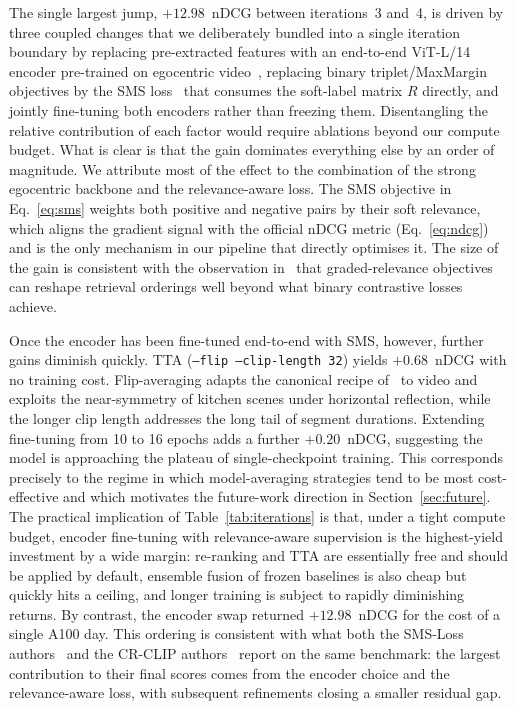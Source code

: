 The single largest jump, $+12.98$~nDCG between iterations~3 and~4, is driven by three coupled changes that we deliberately bundled into a single iteration boundary by replacing pre-extracted features with an end-to-end ViT-L/14 encoder pre-trained on egocentric video~\cite{zhao2023avion,zhao2023lavila}, replacing binary triplet/MaxMargin objectives by the SMS loss~\cite{wang2024symmetricmultisimilaritylossepickitchens100} that consumes the soft-label matrix $R$ directly, and jointly fine-tuning both encoders rather than freezing them. Disentangling the relative contribution of each factor would require ablations beyond our compute budget. What is clear is that the gain dominates everything else by an order of magnitude. We attribute most of the effect to the combination of the strong egocentric backbone and the relevance-aware loss. The SMS objective in Eq.~\eqref{eq:sms} weights both positive and negative pairs by their soft relevance, which aligns the gradient signal with the official nDCG metric (Eq.~\eqref{eq:ndcg}) and is the only mechanism in our pipeline that directly optimises it. The size of the gain is consistent with the observation in~\cite{wray2021semantic} that graded-relevance objectives can reshape retrieval orderings well beyond what binary contrastive losses achieve.

Once the encoder has been fine-tuned end-to-end with SMS, however, further gains diminish quickly. TTA (\texttt{--flip --clip-length 32}) yields $+0.68$~nDCG with no training cost. Flip-averaging adapts the canonical recipe of~\cite{krizhevsky2012alexnet} to video and exploits the near-symmetry of kitchen scenes under horizontal reflection, while the longer clip length addresses the long tail of segment durations. Extending fine-tuning from 10 to 16 epochs adds a further $+0.20$~nDCG, suggesting the model is approaching the plateau of single-checkpoint training. This corresponds precisely to the regime in which model-averaging strategies tend to be most cost-effective and which motivates the future-work direction in Section~\ref{sec:future}. The practical implication of Table~\ref{tab:iterations} is that, under a tight compute budget, encoder fine-tuning with relevance-aware supervision is the highest-yield investment by a wide margin: re-ranking and TTA are essentially free and should be applied by default, ensemble fusion of frozen baselines is also cheap but quickly hits a ceiling, and longer training is subject to rapidly diminishing returns. By contrast, the encoder swap returned $+12.98$~nDCG for the cost of a single A100 day. This ordering is consistent with what both the SMS-Loss authors~\cite{wang2024symmetricmultisimilaritylossepickitchens100} and the CR-CLIP authors~\cite{he2025crclip} report on the same benchmark: the largest contribution to their final scores comes from the encoder choice and the relevance-aware loss, with subsequent refinements closing a smaller residual gap.
